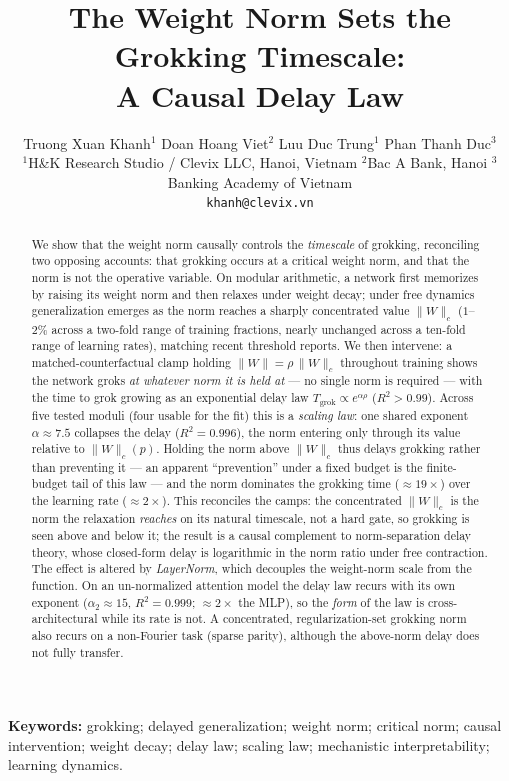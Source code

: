 \documentclass[10pt,twocolumn]{article}
\title{\textbf{The Weight Norm Sets the Grokking Timescale:\\
A Causal Delay Law}}
\author{Truong Xuan Khanh$^{1}$ \quad Doan Hoang Viet$^{2}$ \quad Luu Duc Trung$^{1}$ \quad Phan Thanh Duc$^{3}$\\[2pt]
\small $^{1}$H\&K Research Studio / Clevix LLC, Hanoi, Vietnam \quad
$^{2}$Bac A Bank, Hanoi \quad $^{3}$Banking Academy of Vietnam\\
\small \texttt{khanh@clevix.vn}}
\date{}
\newcommand{\Wc}{\|W\|_{c}}
\begin{document}
\maketitle

\begin{abstract}
We show that the weight norm causally controls the \emph{timescale} of grokking, reconciling two opposing
accounts: that grokking occurs at a critical weight norm, and that the norm is not the operative variable.
On modular arithmetic, a network first memorizes by raising its weight norm and then relaxes under weight
decay; under free dynamics generalization emerges as the norm reaches a sharply concentrated value $\Wc$
($1$--$2\%$ across a two-fold range of training fractions, nearly unchanged across a ten-fold range of
learning rates), matching recent threshold reports. We then intervene: a matched-counterfactual clamp
holding $\|W\|=\rho\,\Wc$ throughout training shows the network groks \emph{at whatever norm it is held at}
--- no single norm is required --- with the time to grok growing as an exponential delay law
$T_{\mathrm{grok}}\propto e^{\alpha\rho}$ ($R^2>0.99$). Across five tested moduli (four usable for the fit)
this is a \emph{scaling law}: one shared exponent $\alpha\approx7.5$ collapses the delay ($R^2=0.996$), the
norm entering only through its value relative to $\Wc(p)$. Holding the norm above $\Wc$ thus delays grokking
rather than preventing it --- an apparent ``prevention'' under a fixed budget is the finite-budget tail of
this law --- and the norm dominates the grokking time ($\approx\!19\times$) over the learning rate
($\approx\!2\times$). This reconciles the camps: the concentrated $\Wc$ is the norm the relaxation
\emph{reaches} on its natural timescale, not a hard gate, so grokking is seen above and below it; the result
is a causal complement to norm-separation delay theory, whose closed-form delay is logarithmic in
the norm ratio under free contraction. The effect is altered by \emph{LayerNorm}, which decouples the
weight-norm scale from the function. On an un-normalized attention model the delay law recurs with its own
exponent ($\alpha_2\approx15$, $R^2=0.999$; $\approx2\times$ the MLP), so the \emph{form} of the law is
cross-architectural while its rate is not. A concentrated, regularization-set grokking norm also recurs on a
non-Fourier task (sparse parity), although the above-norm delay does not fully transfer.
\end{abstract}

\noindent\textbf{Keywords:} grokking; delayed generalization; weight norm; critical norm; causal
intervention; weight decay; delay law; scaling law; mechanistic interpretability; learning dynamics.
\end{document}
